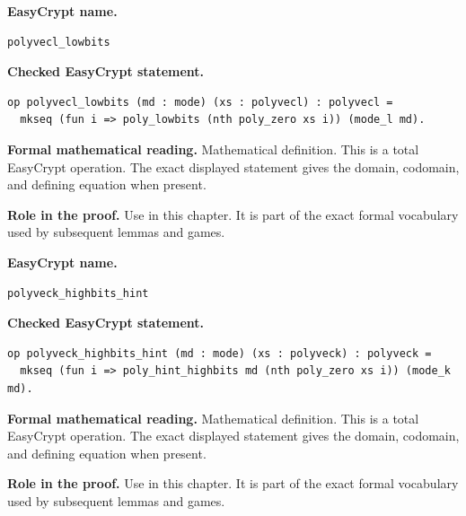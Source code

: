 \begin{formaldefinition}
\noindent\textbf{EasyCrypt name.}
\begin{lstlisting}[language=EasyCrypt,basicstyle=\ttfamily\scriptsize]
polyvecl_lowbits
\end{lstlisting}
\noindent\textbf{Checked EasyCrypt statement.}
\begin{lstlisting}[language=EasyCrypt,basicstyle=\ttfamily\scriptsize]
op polyvecl_lowbits (md : mode) (xs : polyvecl) : polyvecl =
  mkseq (fun i => poly_lowbits (nth poly_zero xs i)) (mode_l md).
\end{lstlisting}
\noindent\textbf{Formal mathematical reading.}
Mathematical definition. This is a total EasyCrypt operation.  The exact displayed statement gives the domain, codomain, and defining equation when present.

\noindent\textbf{Role in the proof.}
Use in this chapter. It is part of the exact formal vocabulary used by subsequent lemmas and games.

\end{formaldefinition}

\begin{formaldefinition}
\noindent\textbf{EasyCrypt name.}
\begin{lstlisting}[language=EasyCrypt,basicstyle=\ttfamily\scriptsize]
polyveck_highbits_hint
\end{lstlisting}
\noindent\textbf{Checked EasyCrypt statement.}
\begin{lstlisting}[language=EasyCrypt,basicstyle=\ttfamily\scriptsize]
op polyveck_highbits_hint (md : mode) (xs : polyveck) : polyveck =
  mkseq (fun i => poly_hint_highbits md (nth poly_zero xs i)) (mode_k md).
\end{lstlisting}
\noindent\textbf{Formal mathematical reading.}
Mathematical definition. This is a total EasyCrypt operation.  The exact displayed statement gives the domain, codomain, and defining equation when present.

\noindent\textbf{Role in the proof.}
Use in this chapter. It is part of the exact formal vocabulary used by subsequent lemmas and games.

\end{formaldefinition}


